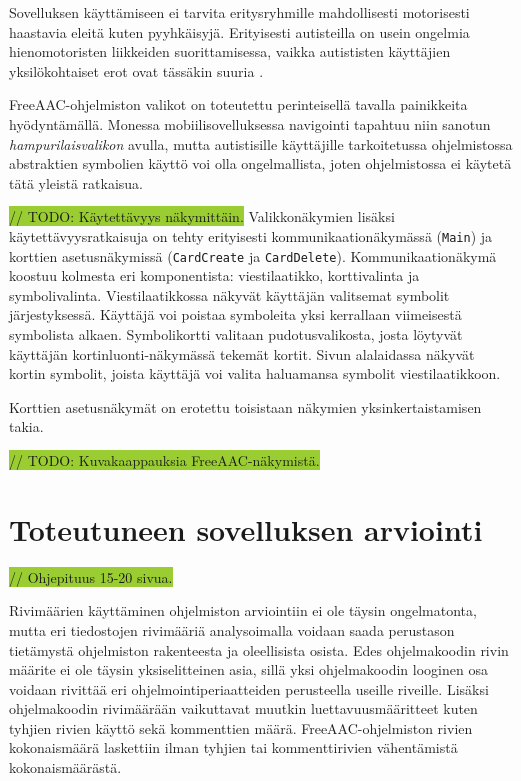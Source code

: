 \documentclass[utf8]{gradu3}
\begin{document}
Sovelluksen käyttämiseen ei tarvita eritysryhmille mahdollisesti motorisesti haastavia eleitä kuten pyyhkäisyjä. Erityisesti autisteilla on usein ongelmia hienomotoristen liikkeiden suorittamisessa, vaikka autististen käyttäjien yksilökohtaiset erot ovat tässäkin suuria \parencite[]{motor-skills-autism}.

FreeAAC-ohjelmiston valikot on toteutettu perinteisellä tavalla painikkeita hyödyntämällä. Monessa mobiilisovelluksessa navigointi tapahtuu niin sanotun \textit{hampurilaisvalikon} avulla, mutta autistisille käyttäjille tarkoitetussa ohjelmistossa abstraktien symbolien käyttö voi olla ongelmallista, joten ohjelmistossa ei käytetä tätä yleistä ratkaisua.

\colorbox{YellowGreen}{// TODO: Käytettävyys näkymittäin.}
Valikkonäkymien lisäksi käytettävyysratkaisuja on tehty erityisesti kommunikaationäkymässä (\texttt{Main}) ja korttien asetusnäkymissä (\texttt{CardCreate} ja \texttt{CardDelete}). Kommunikaationäkymä koostuu kolmesta eri komponentista: viestilaatikko, korttivalinta ja symbolivalinta. Viestilaatikkossa näkyvät käyttäjän valitsemat symbolit järjestyksessä. Käyttäjä voi poistaa symboleita yksi kerrallaan viimeisestä symbolista alkaen. Symbolikortti valitaan pudotusvalikosta, josta löytyvät käyttäjän kortinluonti-näkymässä tekemät kortit. Sivun alalaidassa näkyvät kortin symbolit, joista käyttäjä voi valita haluamansa symbolit viestilaatikkoon.

Korttien asetusnäkymät on erotettu toisistaan näkymien yksinkertaistamisen takia.

\colorbox{YellowGreen}{// TODO: Kuvakaappauksia FreeAAC-näkymistä.}

\chapter{Toteutuneen sovelluksen arviointi}
\colorbox{YellowGreen}{// Ohjepituus 15-20 sivua.}

Rivimäärien käyttäminen ohjelmiston arviointiin ei ole täysin ongelmatonta, mutta eri tiedostojen rivimääriä analysoimalla voidaan saada perustason tietämystä ohjelmiston rakenteesta ja oleellisista osista. Edes ohjelmakoodin rivin määrite ei ole täysin yksiselitteinen asia, sillä yksi ohjelmakoodin looginen osa voidaan rivittää eri ohjelmointiperiaatteiden perusteella useille riveille. Lisäksi ohjelmakoodin rivimäärään vaikuttavat muutkin luettavuusmääritteet kuten tyhjien rivien käyttö sekä kommenttien määrä. FreeAAC-ohjelmiston rivien kokonaismäärä laskettiin ilman tyhjien tai kommenttirivien vähentämistä kokonaismäärästä.
\end{document}
